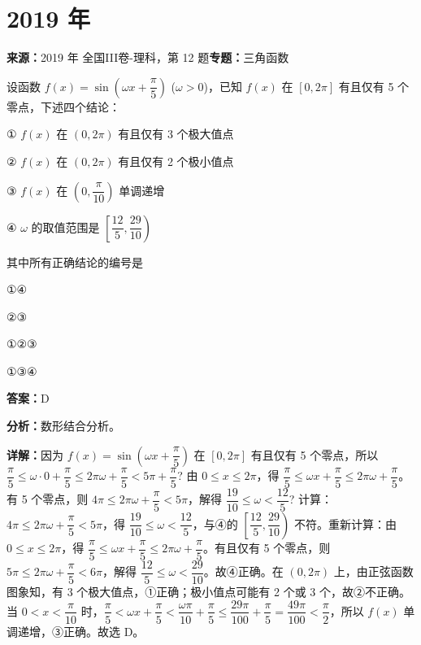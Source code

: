 \section*{2019 年}

\begin{question}[points=5]
\textbf{来源：}2019 年 全国III卷-理科，第 12 题\quad \textbf{专题：}三角函数\par
设函数 $f(x) = \sin\left(\omega x + \dfrac{\pi}{5}\right)$ ($\omega > 0$)，已知 $f(x)$ 在 $[0,2\pi]$ 有且仅有 5 个零点，下述四个结论：

① $f(x)$ 在 $(0,2\pi)$ 有且仅有 3 个极大值点

② $f(x)$ 在 $(0,2\pi)$ 有且仅有 2 个极小值点

③ $f(x)$ 在 $\left(0,\dfrac{\pi}{10}\right)$ 单调递增

④ $\omega$ 的取值范围是 $\left[\dfrac{12}{5},\dfrac{29}{10}\right)$

其中所有正确结论的编号是
\begin{choices}
  \item ①④
  \item ②③
  \item ①②③
  \item ①③④
\end{choices}
\begin{solution}
\textbf{答案：}D

\textbf{分析：}数形结合分析。

\textbf{详解：}因为 $f(x) = \sin\left(\omega x + \dfrac{\pi}{5}\right)$ 在 $[0,2\pi]$ 有且仅有 5 个零点，所以 $\dfrac{\pi}{5} \le \omega \cdot 0 + \dfrac{\pi}{5} \le 2\pi\omega + \dfrac{\pi}{5} < 5\pi + \dfrac{\pi}{5}$? 由 $0\le x\le 2\pi$，得 $\dfrac{\pi}{5} \le \omega x + \dfrac{\pi}{5} \le 2\pi\omega + \dfrac{\pi}{5}$。有 5 个零点，则 $4\pi \le 2\pi\omega + \dfrac{\pi}{5} < 5\pi$，解得 $\dfrac{19}{10} \le \omega < \dfrac{12}{5}$? 计算：$4\pi \le 2\pi\omega + \dfrac{\pi}{5} < 5\pi$，得 $\dfrac{19}{10} \le \omega < \dfrac{12}{5}$，与④的 $\left[\dfrac{12}{5},\dfrac{29}{10}\right)$ 不符。重新计算：由 $0\le x\le 2\pi$，得 $\dfrac{\pi}{5} \le \omega x + \dfrac{\pi}{5} \le 2\pi\omega + \dfrac{\pi}{5}$。有且仅有 5 个零点，则 $5\pi \le 2\pi\omega + \dfrac{\pi}{5} < 6\pi$，解得 $\dfrac{12}{5} \le \omega < \dfrac{29}{10}$。故④正确。在 $(0,2\pi)$ 上，由正弦函数图象知，有 3 个极大值点，①正确；极小值点可能有 2 个或 3 个，故②不正确。当 $0<x<\dfrac{\pi}{10}$ 时，$\dfrac{\pi}{5} < \omega x + \dfrac{\pi}{5} < \dfrac{\omega\pi}{10} + \dfrac{\pi}{5} \le \dfrac{29\pi}{100} + \dfrac{\pi}{5} = \dfrac{49\pi}{100} < \dfrac{\pi}{2}$，所以 $f(x)$ 单调递增，③正确。故选 D。
\end{solution}
\end{question}

